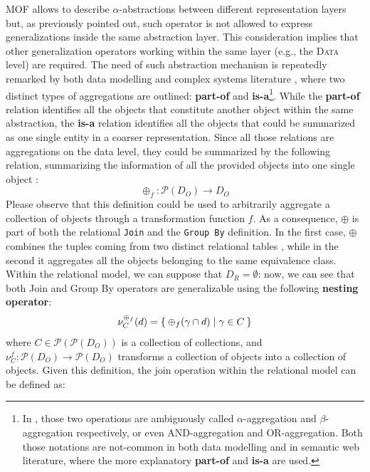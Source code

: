 MOF allows to describe $\alpha$-abstractions between different representation layers but, as previously pointed out, such operator is not allowed to express generalizations inside the same abstraction layer. This consideration implies that other generalization operators working within the same layer (e.g., the \textsc{Data} level) are required. The need of such abstraction mechanism is repeatedly remarked by both data modelling  \cite{Pressman09,Larman04} and complex systems literature \cite{Johnson2011}, where two distinct types of aggregations are outlined: \textbf{part-of} and \textbf{is-a}\footnote{In \cite{Johnson2011}, those two operations are ambiguously called  $\alpha$-aggregation and $\beta$-aggregation respectively, or even AND-aggregation and OR-aggregation. Both those notations are not-common in both data modelling and in semantic web literature, where the more explanatory \textbf{part-of} and \textbf{is-a} are used.}. While the \textbf{part-of} relation identifies all the objects that constitute another object within the same abstraction, the \textbf{is-a} relation identifies all the objects that could be summarized as one single entity in a coarser representation. Since all those relations are aggregations on the data level, they could be summarized by the following relation, summarizing the information of all the provided objects into one single object \cite{BergamiMM16,BergamiMM17}:
\begin{equation}\label{eq:nestingAggregation}
\oplus_f\colon\mathcal{P}(D_O)\to D_O
\end{equation}
Please observe that this definition could be used to arbitrarily aggregate a collection of objects through a transformation function $f$. As a consequence, $\oplus$ is part of both the relational \texttt{Join} and  the \texttt{Group By} definition. In the first case, $\oplus$  combines the tuples coming from two distinct relational tables \cite{BergamiMM16}, while in the second it aggregates all the objects belonging to the same equivalence class. Within the relational model, we can suppose that $D_R=\emptyset$: now, we can see that both Join and Group By operators are generalizable using the following \textbf{nesting operator}\index{$\nu$}:
\begin{equation}\label{def:nestingfirst}
\nu_C^{\oplus_f}(d)=\Set{\oplus_f(\gamma\cap d)|\gamma\in C}
\end{equation}
where $C\in \mathcal{P}(\mathcal{P}(D_O))$ is a collection of collections, and $\nu_C^f\colon \mathcal{P}(D_O)\to \mathcal{P}(D_O)$ transforms a collection of objects into a collection of objects. Given this definition, the join operation within the relational model can be defined as:
